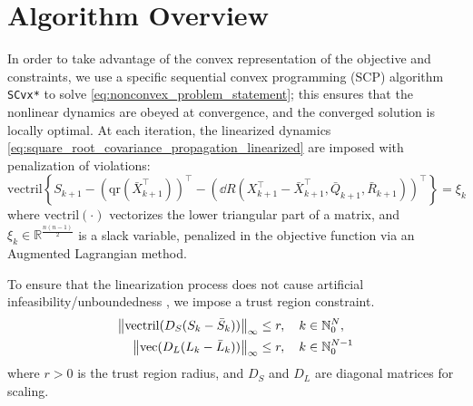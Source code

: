 \documentclass{IEEEtran}
\begin{document}
\section{Algorithm Overview}
In order to take advantage of the convex representation of the objective and constraints, we use a specific sequential convex programming (SCP) algorithm \texttt{SCvx*} \cite{oguriSuccessiveConvexificationFeasibility2023a} to solve \eqref{eq:nonconvex_problem_statement}; this ensures that the nonlinear dynamics are obeyed at convergence, and the converged solution is locally optimal. At each iteration, the linearized dynamics \eqref{eq:square_root_covariance_propagation_linearized} are imposed with penalization of violations:
\begin{equation} \label{eq:linearized_dynamics}
	\mathrm{vectril} \left\{ S_{k+1} - (\mathrm{qr}(\bar{X}_{k+1}^\top))^\top - \left( \dd R(X_{k+1}^\top - \bar{X}_{k+1}^\top, \bar{Q}_{k+1}, \bar{R}_{k+1}) \right)^\top \right\} = \xi_k
\end{equation}
where $\mathrm{vectril}(\cdot)$ vectorizes the lower triangular part of a matrix, and \( \xi_k \in \mathbb{R}^{\frac{n(n-1)}{2}}\) is a slack variable, penalized in the objective function via an Augmented Lagrangian method. 

To ensure that the linearization process does not cause artificial infeasibility/unboundedness \cite{maoSuccessiveConvexificationNonconvex2016}, we impose a trust region constraint. 
\begin{align} \label{eq:trust_region_constraint}
	\norm{\mathrm{vectril}(D_S(S_k - \bar{S}_k))}_\infty &\leq r, \quad k \in \mathbb{N}_{0}^{N}, \\
	\norm{\mathrm{vec}(D_L(L_k - \bar{L}_k))}_\infty &\leq r, \quad k \in \mathbb{N}_{0}^{N-1}
\end{align}
where \( r > 0 \) is the trust region radius, and \( D_S \) and \( D_L \) are diagonal matrices for scaling.

\end{document}
